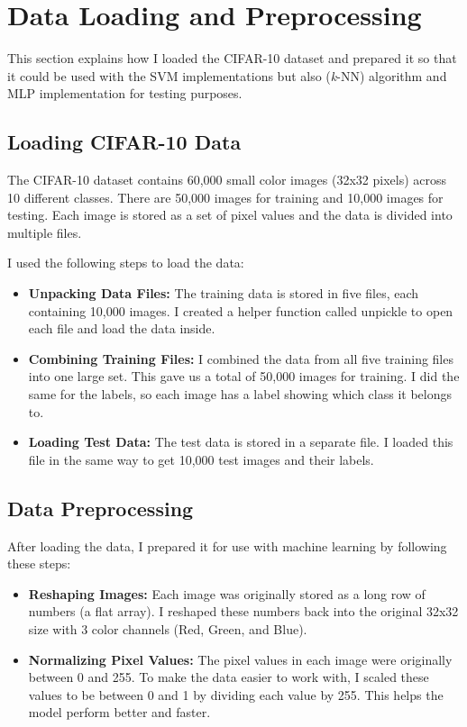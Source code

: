 \documentclass[lettersize,journal]{IEEEtran}
\begin{document}
\section{\textbf{Data Loading and Preprocessing}}

This section explains how I loaded the CIFAR-10 dataset and prepared it so that it could be used with the SVM implementations but also (\textit{k}-NN) algorithm and MLP implementation for testing purposes.

\subsection{\textbf{Loading CIFAR-10 Data}}
The CIFAR-10 dataset contains 60,000 small color images (32x32 pixels) across 10 different classes. There are 50,000 images for training and 10,000 images for testing. Each image is stored as a set of pixel values and the data is divided into multiple files.

I used the following steps to load the data:
\begin{itemize}
    \item \textbf{Unpacking Data Files:} The training data is stored in five files, each containing 10,000 images. I created a helper function called unpickle to open each file and load the data inside.
    \item \textbf{Combining Training Files:} I combined the data from all five training files into one large set. This gave us a total of 50,000 images for training. I did the same for the labels, so each image has a label showing which class it belongs to.
    \item \textbf{Loading Test Data:} The test data is stored in a separate file. I loaded this file in the same way to get 10,000 test images and their labels.
\end{itemize}

\subsection{\textbf{Data Preprocessing}}
After loading the data, I prepared it for use with machine learning by following these steps:

\begin{itemize}
    \item \textbf{Reshaping Images:} Each image was originally stored as a long row of numbers (a flat array). I reshaped these numbers back into the original 32x32 size with 3 color channels (Red, Green, and Blue).
    \item \textbf{Normalizing Pixel Values:} The pixel values in each image were originally between 0 and 255. To make the data easier to work with, I scaled these values to be between 0 and 1 by dividing each value by 255. This helps the model perform better and faster.
\end{itemize}
\end{document}
